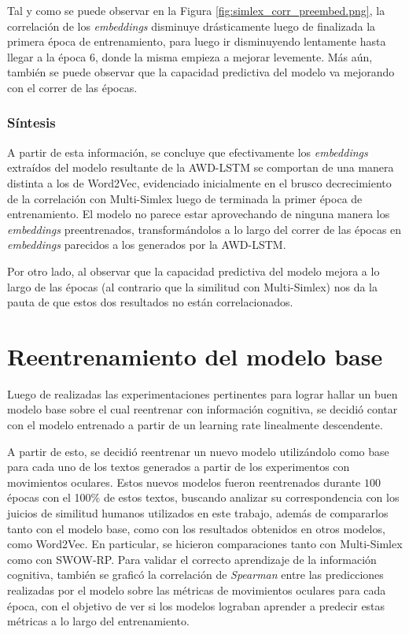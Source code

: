 Tal y como se puede observar en la Figura \ref{fig:simlex_corr_preembed.png}, la correlación de los 
\textit{embeddings} disminuye drásticamente luego de finalizada la primera época 
de entrenamiento, para luego ir disminuyendo lentamente hasta llegar 
a la época $6$, donde la misma empieza a mejorar levemente. Más aún, también 
se puede observar que la capacidad predictiva del modelo va mejorando 
con el correr de las épocas.

\subsubsection{Síntesis}

A partir de esta información, se concluye que efectivamente los \textit{embeddings} 
extraídos del modelo resultante de la AWD-LSTM se comportan de una manera 
distinta a los de Word2Vec, evidenciado inicialmente en el brusco decrecimiento 
de la correlación con Multi-Simlex luego de terminada la primer época de 
entrenamiento. El modelo no parece estar aprovechando de ninguna manera 
los \textit{embeddings} preentrenados, transformándolos a lo largo del correr de 
las épocas en \textit{embeddings} parecidos a los generados por la AWD-LSTM.

Por otro lado, al observar que la capacidad predictiva del modelo mejora a 
lo largo de las épocas (al contrario que la similitud con Multi-Simlex) nos da 
la pauta de que estos dos resultados no están correlacionados.

\section{Reentrenamiento del modelo base}

\label{sec:reentrenamiento}

Luego de realizadas las experimentaciones pertinentes para lograr hallar un buen 
modelo base sobre el cual reentrenar con información cognitiva, se decidió contar 
con el modelo entrenado a partir de un learning rate linealmente descendente.

A partir de esto, se decidió reentrenar un nuevo modelo utilizándolo como base 
para cada uno de los textos generados a partir de los experimentos con 
movimientos oculares. Estos nuevos modelos fueron reentrenados durante 
$100$ épocas con el 100\% de estos textos, buscando analizar su correspondencia 
con los juicios de similitud humanos utilizados en este trabajo, además 
de compararlos tanto con el modelo base, como con los resultados obtenidos 
en otros modelos, como Word2Vec. En particular, se hicieron comparaciones 
tanto con Multi-Simlex como con SWOW-RP. Para validar el correcto aprendizaje 
de la información cognitiva, también se graficó la correlación de \textit{Spearman} 
entre las predicciones realizadas por el modelo sobre las métricas de 
movimientos oculares para cada época, con el objetivo de ver si los modelos 
lograban aprender a predecir estas métricas a lo largo del entrenamiento.

